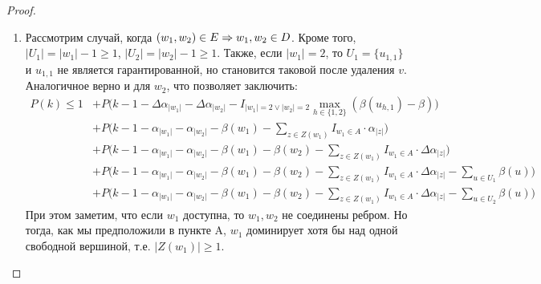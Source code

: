\begin{proof}
\begin{enumerate}[label=\Alph*]
\begin{enumerate}
            \begin{align*}
                P(k) \le 1 &+ P\bigg(k - 1 - \Delta\alpha_{|w_1|} - \Delta\alpha_{|w_2|} - I_{|w_1|=2}(\beta(w_1) - \beta) - I_{|w_2|=2}(\beta(w_2) - \beta)\bigg) \\
                &+ P\bigg(k - 1 - \alpha_{|w_1|} - \alpha_{|w_2|} - \beta(w_1) - \sum_{z \in Z(w_1)} I_{w_1 \in A} \cdot \alpha_{|z|}\bigg) \\
                &+ P\bigg(k - 1 - \alpha_{|w_1|} - \alpha_{|w_2|} - \beta(w_1) - \beta(w_2) - \sum_{z \in Z(w_1)} I_{w_1 \in A} \cdot \Delta\alpha_{|z|}\bigg) \\
                &+ P\bigg(k - 1 - \alpha_{|w_1|} - \alpha_{|w_2|} - \beta(w_1) - \beta(w_2) - \sum_{z \in Z(w_1)} I_{w_1 \in A} \cdot \Delta\alpha_{|z|} - \sum_{u \in U_1 \cup U_2} \beta(u)\bigg)
            \end{align*}
            \item Рассмотрим случай, когда \((w_1, w_2) \in E \Rightarrow w_1, w_2 \in D\). Кроме того, \(|U_1| = |w_1| - 1 \ge 1\), \(|U_2| = |w_2| - 1 \ge 1\). Также, если \(|w_1| = 2\), то \(U_1 = \{u_{1, 1}\}\) и \(u_{1, 1}\) не является гарантированной, но становится таковой после удаления \(v\). Аналогичное верно и для \(w_2\), что позволяет заключить:
            \begin{align*}
                P(k) \le 1 &+ P\bigg(k - 1 - \Delta\alpha_{|w_1|} - \Delta\alpha_{|w_2|} - I_{|w_1|=2 \vee |w_2|=2} \max_{h\in\{1,2\}} (\beta(u_{h,1}) - \beta)\bigg) \\
                &+ P\bigg(k - 1 - \alpha_{|w_1|} - \alpha_{|w_2|} - \beta(w_1) - \sum_{z \in Z(w_1)} I_{w_1 \in A} \cdot \alpha_{|z|}\bigg) \\
                &+ P\bigg(k - 1 - \alpha_{|w_1|} - \alpha_{|w_2|} - \beta(w_1) - \beta(w_2) - \sum_{z \in Z(w_1)} I_{w_1 \in A} \cdot \Delta\alpha_{|z|}\bigg) \\
                &+ P\bigg(k - 1 - \alpha_{|w_1|} - \alpha_{|w_2|} - \beta(w_1) - \beta(w_2) - \sum_{z \in Z(w_1)} I_{w_1 \in A} \cdot \Delta\alpha_{|z|} - \sum_{u \in U_1} \beta(u)\bigg) \\
                &+ P\bigg(k - 1 - \alpha_{|w_1|} - \alpha_{|w_2|} - \beta(w_1) - \beta(w_2) - \sum_{z \in Z(w_1)} I_{w_1 \in A} \cdot \Delta\alpha_{|z|} - \sum_{u \in U_2} \beta(u)\bigg)
            \end{align*}
            При этом заметим, что если \(w_1\) доступна, то \(w_1, w_2\) не соединены ребром. Но тогда, как мы предположили в пункте A, \(w_1\) доминирует хотя бы над одной свободной вершиной, т.е. \(|Z(w_1)| \ge 1\).

\end{enumerate}
\end{enumerate}
\end{proof}
